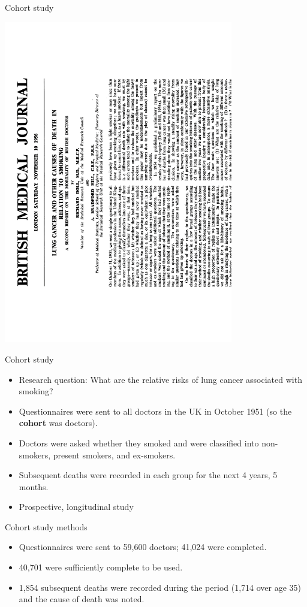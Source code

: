 \documentclass{beamer}
\begin{document}
\begin{frame}{Cohort study}
\begin{center}
\includegraphics[angle=270, origin=c, width=10cm]{images/dollHill1956.pdf}
\end{center}
\end{frame}

\begin{frame}{Cohort study \citep{Doll1956}}
	\begin{itemize}
	\item Research question: What are the relative risks of lung cancer associated with smoking?
	\item Questionnaires were sent to all doctors in the UK in October 1951 (so the \textbf{cohort} was doctors).
	\item Doctors were asked whether they smoked and were classified into non-smokers, present smokers, and ex-smokers.
	\item Subsequent deaths were recorded in each group for the next 4 years, 5 months.
	\item Prospective, longitudinal study
	\end{itemize}
\end{frame}

\begin{frame}{Cohort study methods \citep{Doll1956}}
	\begin{itemize}
	\item Questionnaires were sent to 59,600 doctors; 41,024 were completed.
	\item 40,701 were sufficiently complete to be used.
	\item 1,854 subsequent deaths were recorded during the period (1,714 over age 35) and the cause of death was noted.
	\end{itemize}
\end{frame}
\end{document}
